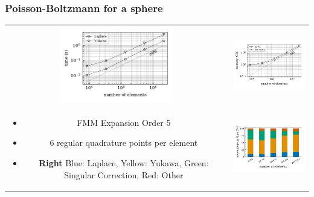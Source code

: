 \documentclass[dvipsnames,10pt]{beamer}
\begin{document}
\begin{frame}
    \frametitle{Poisson-Boltzmann for a sphere}

    \begin{center}
        \begin{tabular}{cc}
            \includegraphics[width=5cm]{../figs/sphere_fmm.pdf} &
            \includegraphics[width=5cm]{../figs/sphere_memory.pdf} \\
            \begin{minipage}{5cm}
                \vspace{-3.5cm}
                \begin{itemize}
                    \item FMM Expansion Order 5
                    \item 6 regular quadrature points per element
                    \item \textbf{Right} Blue: Laplace, 
                        Yellow: Yukawa, Green: Singular Correction, Red: Other
                \end{itemize} 
            \end{minipage} &
            \includegraphics[width=5cm]{../figs/sphere_gmres_derivative.pdf}
        \end{tabular}
    \end{center}
\end{frame}
\end{document}
